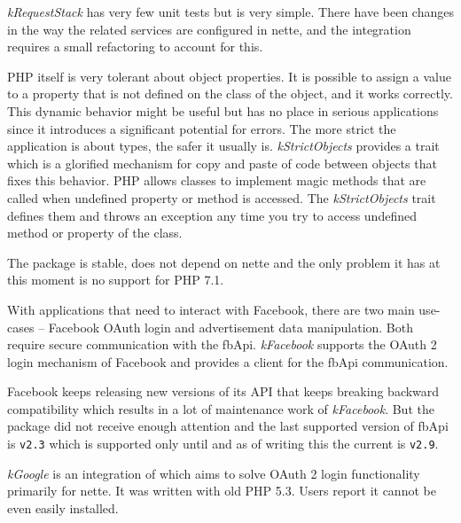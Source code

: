 \textit{\gls{kRequestStack}} has very few unit tests but is very simple. There have been changes in the way the related services are configured in \gls{nette}, and the integration requires a small refactoring to account for this.

 \label{sec:state:strict-objects}

PHP itself is very tolerant about object properties. It is possible to assign a value to a property that is not defined on the class of the object, and it works correctly. This dynamic behavior might be useful but has no place in serious applications since it introduces a significant potential for errors. The more strict the application is about types, the safer it usually is. \textit{\gls{kStrictObjects}} provides a trait which is a glorified mechanism for copy and paste of code between objects that fixes this behavior. PHP allows classes to implement magic methods that are called when undefined property or method is accessed. The \textit{\gls{kStrictObjects}} trait defines them and throws an exception any time you try to access undefined method or property of the class.

The package is stable, does not depend on \gls{nette} and the only problem it has at this moment is no support for PHP 7.1.

 \label{sec:state:facebook}

With applications that need to interact with Facebook, there are two main use-cases -- Facebook OAuth login and advertisement data manipulation. Both require secure communication with the \gls{fbApi}. \textit{\gls{kFacebook}} supports the OAuth 2 login mechanism of Facebook and provides a client for the \gls{fbApi} communication.

Facebook keeps releasing new versions of its API that keeps breaking backward compatibility which results in a lot of maintenance work of \textit{\gls{kFacebook}}. But the package did not receive enough attention and the last supported version of \gls{fbApi} is \lstinline{v2.3} which is supported only until  and as of writing this the current  is \lstinline{v2.9}.

 \label{sec:state:google}

\textit{\gls{kGoogle}} is an integration of  which aims to solve OAuth 2 login functionality primarily for \gls{nette}. It was written with old PHP 5.3. Users report it cannot be even easily installed.

